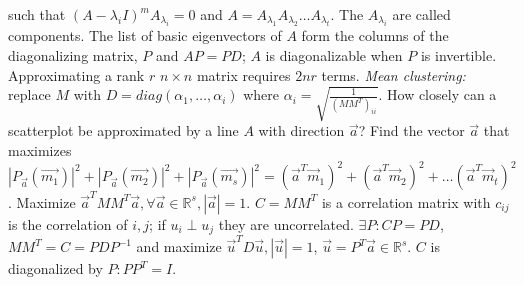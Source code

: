 such that $(A-\lambda_i I)^m A_{\lambda_i} =0$ and
$A= A_{\lambda_1} A_{\lambda_2} \ldots A_{\lambda_t}$.  The $A_{\lambda_i}$ are called components.
The list of basic eigenvectors of $A$ form the columns of the diagonalizing matrix, $P$ and
$AP=PD$; $A$ is diagonalizable when $P$ is invertible.
Approximating a rank $r$ $n \times n$ matrix requires $2nr$ terms.  \emph{Mean clustering:}
replace $M$ with $D= diag(\alpha_1, \ldots, \alpha_i)$ where
$\alpha_i= {\sqrt {\frac 1 {(M M^T)_{ii}}}}$.   How closely can a scatterplot be approximated
by a line $A$ with direction ${\vec a}$?  Find the vector ${\vec a}$ that maximizes
$
|P_{\vec a} ({\vec {m_1}})|^2 +
|P_{\vec a} ({\vec {m_2}})|^2 +
|P_{\vec a} ({\vec {m_s}})|^2 =
({\vec a}^T {\vec m_1})^2 + ({\vec a}^T {\vec m_2})^2 +
\ldots ({\vec a}^T {\vec m_t})^2$.  Maximize ${\vec a}^T M M^T {\vec a},
\forall {\vec a} \in {\mathbb R}^s, |{\vec a}|=1$.  $C=M M^T$ is a correlation matrix
with
$c_{ij}$ is the correlation of $i, j$; if $u_i \perp u_j$ they are uncorrelated.
$\exists P: CP=PD$, $M M^T=C= PDP^{-1}$ and maximize ${\vec u}^T D {\vec u}, |{\vec u}|=1$,
${\vec u}= P^T {\vec a} \in {\mathbb R}^s$.  $C$ is diagonalized by $P: P P^T=I$.
